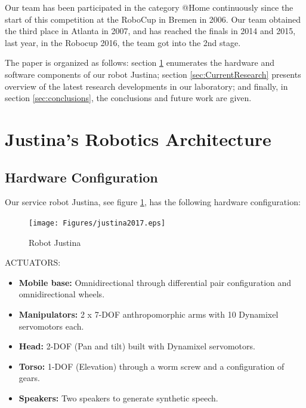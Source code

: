 \documentclass{llncs}
\begin{document}
Our team has been participated in the category @Home continuously since the start of this competition at the
RoboCup in Bremen in 2006. Our team obtained the third place in Atlanta in 2007, and has reached the finals in 2014 and 2015, 
last year, in the Robocup 2016, the team got into the 2nd stage.

The paper is organized as follows:
section \ref{sec:background} enumerates the hardware and software components of our robot
Justina; section \ref{sec:CurrentResearch}  presents overview of the latest research developments in our
laboratory; and finally, in section \ref{sec:conclusions}, the conclusions and future work are given.


\section{Justina's Robotics Architecture}\label{sec:background}
\subsection{Hardware Configuration}

Our service robot Justina, see figure \ref{fig:justina}, has the following hardware configuration:\\

\begin{figure}
	\texttt{[image: Figures/justina2017.eps]}
  \caption{Robot Justina}
  \label{fig:justina}
\end{figure}



ACTUATORS:

\begin{itemize}
	\item \textbf{Mobile base:} Omnidirectional through differential pair configuration and omnidirectional wheels. 
	\item \textbf{Manipulators:} 2 x 7-DOF anthropomorphic arms with 10 Dynamixel servomotors each.
	\item \textbf{Head:} 2-DOF (Pan and tilt) built with Dynamixel servomotors.
	\item \textbf{Torso:} 1-DOF (Elevation) through a worm screw and a configuration of gears. 
	\item \textbf{Speakers:} Two speakers to generate synthetic speech.
\end{itemize}
\end{document}
